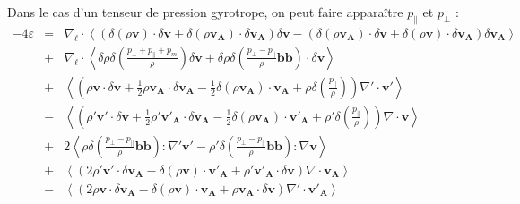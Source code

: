 Dans le cas d'un tenseur de pression gyrotrope, on peut faire apparaître $p_{\parallel}$ et $p_{\perp}$ : 
\begin{equation}
\label{eq:turb_cpgyr_elk}%
\begin{array}{lcl}
- 4\varepsilon &=& \nabla_{\boldsymbol{\ell}} \cdot \left<\left(\delta \left(\rho\boldsymbol{v}\right) \cdot \delta \boldsymbol{v}+ \delta \left(\rho\boldsymbol{v_A}\right) \cdot \delta \boldsymbol{v_A} \right)\delta \boldsymbol{v}  -\left(\delta \left(\rho\boldsymbol{v_A}\right) \cdot \delta \boldsymbol{v}  + \delta \left(\rho\boldsymbol{v}\right) \cdot \delta \boldsymbol{v_A}  \right) \delta \boldsymbol{v_A} \right>\\
&+& \nabla_{\boldsymbol{\ell}} \cdot \left< \delta \rho  \delta \left(\frac{p_{\perp} + p_{\parallel}+p_m}{\rho}\right) \delta \boldsymbol{v}+\delta \rho \delta \left(\frac{p_{\perp} - p_{\parallel}}{\rho}\boldsymbol{b}\boldsymbol{b}\right) \cdot \delta \boldsymbol{v} \right> \\
& +&\left< \left(\rho \boldsymbol{v} \cdot \delta \boldsymbol{v} +\frac{1}{2} \rho \boldsymbol{v_A} \cdot  \delta \boldsymbol{v_A} -\frac{1}{2} \delta \left(\rho \boldsymbol{v_A}\right) \cdot \boldsymbol{v_A} +\rho \delta \left(\frac{p_{\parallel}}{\rho}\right)\right) \nabla' \cdot \boldsymbol{v'} \right>\\
 & -&\left< \left(\rho' \boldsymbol{v'} \cdot \delta \boldsymbol{v}  + \frac{1}{2} \rho' \boldsymbol{v'_A} \cdot \delta \boldsymbol{v_A}  - \frac{1}{2} \delta \left(\rho \boldsymbol{v_A}\right) \cdot \boldsymbol{v'_A}  +\rho' \delta \left(\frac{p_{\parallel}}{\rho}\right)\right)\nabla \cdot \boldsymbol{v} \right>\\
 &+&2\left<\rho \delta \left(\frac{p_{\perp} - p_{\parallel}}{\rho}\boldsymbol{b}\boldsymbol{b}\right):\nabla' \boldsymbol{v'} - \rho' \delta \left(\frac{p_{\perp} - p_{\parallel}}{\rho}\boldsymbol{b}\boldsymbol{b}\right) :\nabla  \boldsymbol{v}\right>\\
&+& \left<\left(2 \rho' \boldsymbol{v'} \cdot \delta \boldsymbol{v_A}- \delta \left(\rho \boldsymbol{v}\right) \cdot \boldsymbol{v'_A} + \rho' \boldsymbol{v'_A} \cdot \delta \boldsymbol{v}  \right)\nabla \cdot \boldsymbol{v_A}\right>\\
 &-& \left<\left(2\rho \boldsymbol{v} \cdot \delta \boldsymbol{v_A} - \delta \left(\rho \boldsymbol{v}\right) \cdot \boldsymbol{v_A} +  \rho \boldsymbol{v_A} \cdot \delta \boldsymbol{v} \right)\nabla' \cdot \boldsymbol{v'_A}\right>\\

\end{array}
\end{equation}
